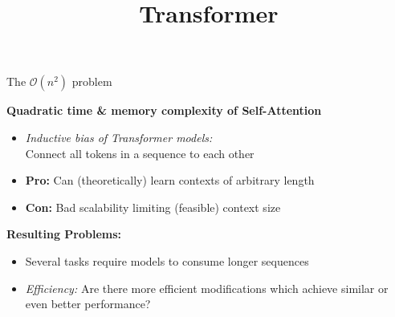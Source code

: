 



\newcommand{\titlefigure}{figure/sesamestreet.jpeg}
\newcommand{\learninggoals}{
\item Understand the efficiency problems and shortcomings of transformer-based models
\item Learn about some strategies to alleviate them}

\title{Transformer}
\date{}





\begin{frame}{The $\mathcal{O}(n^2)$ problem}

\vfill

\textbf{Quadratic time \& memory complexity of Self-Attention}

\begin{itemize}
	\item \textit{Inductive bias of Transformer models:}\\
				Connect all tokens in a sequence to each other
	\item \textbf{Pro:} Can (theoretically) learn contexts of arbitrary length
	\item \textbf{Con:} Bad scalability limiting (feasible) context size
\end{itemize}

\vspace{.3cm}

\textbf{Resulting Problems:}

\begin{itemize}
	\item Several tasks require models to consume longer sequences
	\item \textit{Efficiency:} Are there more efficient modifications which achieve similar or even better performance? 
\end{itemize}
	
\vfill

\end{frame}


